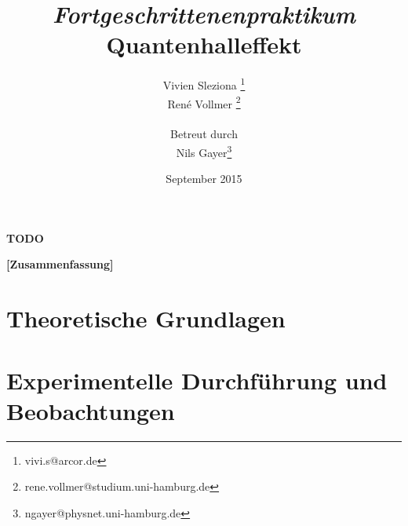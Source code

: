 \documentclass[12pt,a4paper]{article}
\begin{document}
	
	\textbf{TODO}
	
	
	
	\title{\textit{Fortgeschrittenenpraktikum}\\\textbf{Quantenhalleffekt} }
	\date{September 2015}
	\author{Vivien Sleziona \footnote{vivi.s@arcor.de}\\ René Vollmer \footnote{rene.vollmer@studium.uni-hamburg.de} \\ \\Betreut durch\\ Nils Gayer\footnote{ngayer@physnet.uni-hamburg.de}}
	
	\maketitle
	
	\begin{center} 
		\bigskip
		\bigskip
		
		\begin{minipage}{0.75\textwidth}
			\textbf{[Zusammenfassung]}
			
		\end{minipage}
	\end{center}
	
	\newpage
	
	\tableofcontents
	\vfill
	\newpage
	\clearpage	
	
	
	\section{Theoretische Grundlagen}
	
	

	
	\newpage
	\clearpage
	
	\section{Experimentelle Durchführung und Beobachtungen}
	
\end{document}
